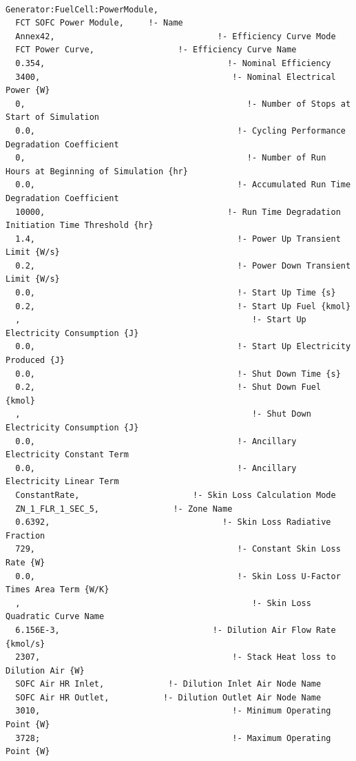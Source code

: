 \begin{lstlisting}

Generator:FuelCell:PowerModule,
  FCT SOFC Power Module,     !- Name
  Annex42,                                 !- Efficiency Curve Mode
  FCT Power Curve,                 !- Efficiency Curve Name
  0.354,                                     !- Nominal Efficiency
  3400,                                       !- Nominal Electrical Power {W}
  0,                                             !- Number of Stops at Start of Simulation
  0.0,                                         !- Cycling Performance Degradation Coefficient
  0,                                             !- Number of Run Hours at Beginning of Simulation {hr}
  0.0,                                         !- Accumulated Run Time Degradation Coefficient
  10000,                                     !- Run Time Degradation Initiation Time Threshold {hr}
  1.4,                                         !- Power Up Transient Limit {W/s}
  0.2,                                         !- Power Down Transient Limit {W/s}
  0.0,                                         !- Start Up Time {s}
  0.2,                                         !- Start Up Fuel {kmol}
  ,                                               !- Start Up Electricity Consumption {J}
  0.0,                                         !- Start Up Electricity Produced {J}
  0.0,                                         !- Shut Down Time {s}
  0.2,                                         !- Shut Down Fuel {kmol}
  ,                                               !- Shut Down Electricity Consumption {J}
  0.0,                                         !- Ancillary Electricity Constant Term
  0.0,                                         !- Ancillary Electricity Linear Term
  ConstantRate,                       !- Skin Loss Calculation Mode
  ZN_1_FLR_1_SEC_5,               !- Zone Name
  0.6392,                                   !- Skin Loss Radiative Fraction
  729,                                         !- Constant Skin Loss Rate {W}
  0.0,                                         !- Skin Loss U-Factor Times Area Term {W/K}
  ,                                               !- Skin Loss Quadratic Curve Name
  6.156E-3,                               !- Dilution Air Flow Rate {kmol/s}
  2307,                                       !- Stack Heat loss to Dilution Air {W}
  SOFC Air HR Inlet,             !- Dilution Inlet Air Node Name
  SOFC Air HR Outlet,           !- Dilution Outlet Air Node Name
  3010,                                       !- Minimum Operating Point {W}
  3728;                                       !- Maximum Operating Point {W}
\end{lstlisting}

